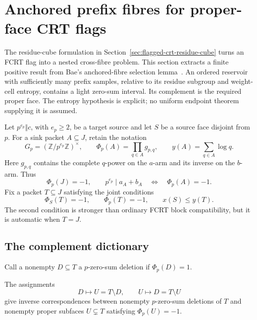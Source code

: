 \section{Anchored prefix fibres for proper-face CRT flags}
\label{sec:anchored-prefix-flagged-crt}

The residue-cube formulation in
Section~\ref{sec:flagged-crt-residue-cube} turns an FCRT flag into a nested
cross-fibre problem.  This section extracts a finite positive result from
Bae's anchored-fibre selection lemma~\cite{Bae2026Erdos684}.  An ordered
reservoir with sufficiently many prefix samples, relative to its residue
subgroup and weight-cell entropy, contains a light zero-sum interval.  Its
complement is the required proper face.  The entropy hypothesis is explicit;
no uniform endpoint theorem supplying it is assumed.

Let $p^{e_p}\Vert c$, with $e_p\ge2$, be a target source and let $S$ be a
source face disjoint from $p$.  For a sink packet $A\subseteq J$, retain the
notation
\[
 G_p=(\mathbb Z/p^{e_p}\mathbb Z)^\times,
 \qquad
 \Phi_p(A)=\prod_{q\in A}g_{p,q},
 \qquad
 y(A)=\sum_{q\in A}\log q.
\tag{APF-1}\label{eq:apf-notation}
\]
Here $g_{p,q}$ contains the complete $q$-power on the $a$-arm and its
inverse on the $b$-arm.  Thus
\[
 \Phi_p(J)=-1,
 \qquad
 p^{e_p}\mid a_A+b_A
 \quad\Longleftrightarrow\quad
 \Phi_p(A)=-1.
\tag{APF-2}\label{eq:apf-compatibility}
\]
Fix a packet $T\subseteq J$ satisfying the joint conditions
\[
 \Phi_S(T)=-1,\qquad \Phi_p(T)=-1,\qquad x(S)\le y(T).
\tag{APF-3}\label{eq:apf-joint-block}
\]
The second condition is stronger than ordinary FCRT block compatibility,
but it is automatic when $T=J$.

\subsection{The complement dictionary}

Call a nonempty $D\subseteq T$ a $p$-zero-sum deletion if
$\Phi_p(D)=1$.

\begin{proposition}
\label{prop:apf-complement-dictionary}
The assignments
\[
                         D\longmapsto U=T\setminus D,
 \qquad U\longmapsto D=T\setminus U
\tag{APF-4}\label{eq:apf-complement-map}
\]
give inverse correspondences between nonempty $p$-zero-sum deletions of
$T$ and nonempty proper subfaces $U\subsetneq T$ satisfying
$\Phi_p(U)=-1$.
\end{proposition}

